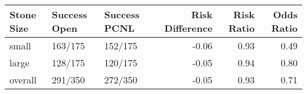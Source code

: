 \begin{table}[ht]
\centering
\begin{tabular}{lllrrr}
  \toprule
{\textbf{Stone Size}} & {\textbf{Success Open}} & {\textbf{Success PCNL}} & {\textbf{Risk Difference}} & {\textbf{Risk Ratio}} & {\textbf{Odds Ratio}} \\ 
  \midrule
small & 163/175 & 152/175 & -0.06 & 0.93 & 0.49 \\ 
  large & 128/175 & 120/175 & -0.05 & 0.94 & 0.80 \\ 
  overall & 291/350 & 272/350 & -0.05 & 0.93 & 0.71 \\ 
   \bottomrule
\end{tabular}
\end{table}
